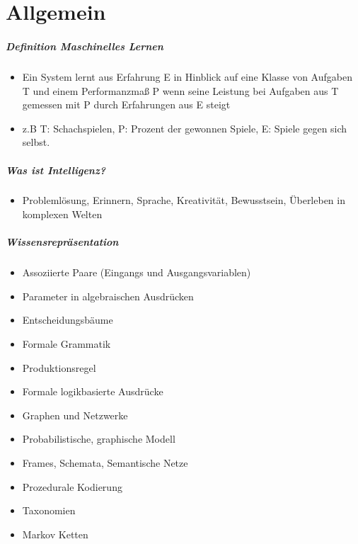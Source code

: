 \chapter{Allgemein}
\label{chap:Allgemein}

\paragraph{Definition Maschinelles Lernen}

\begin{itemize}
    \item Ein System lernt aus Erfahrung E in Hinblick auf eine Klasse von Aufgaben
    T und einem Performanzmaß P wenn seine Leistung bei Aufgaben aus T gemessen mit
    P durch Erfahrungen aus E steigt
    \item z.B T: Schachspielen, P: Prozent der gewonnen Spiele, E: Spiele gegen sich selbst.
\end{itemize}

\paragraph{Was ist Intelligenz?}
\label{par:Was ist Intelligenz?}
\begin{itemize}
    \item Problemlösung, Erinnern, Sprache, Kreativität, Bewusstsein, Überleben
    in komplexen Welten
\end{itemize}

\paragraph{Wissensrepräsentation}
\label{par:Wissensrepraesentation}
\begin{itemize}
    \item Assoziierte Paare (Eingangs und Ausgangsvariablen)
    \item Parameter in algebraischen Ausdrücken
    \item Entscheidungsbäume
    \item Formale Grammatik
    \item Produktionsregel
    \item Formale logikbasierte Ausdrücke
    \item Graphen und Netzwerke
    \item Probabilistische, graphische Modell
    \item Frames, Schemata, Semantische Netze
    \item Prozedurale Kodierung
    \item Taxonomien
    \item Markov Ketten
\end{itemize}

